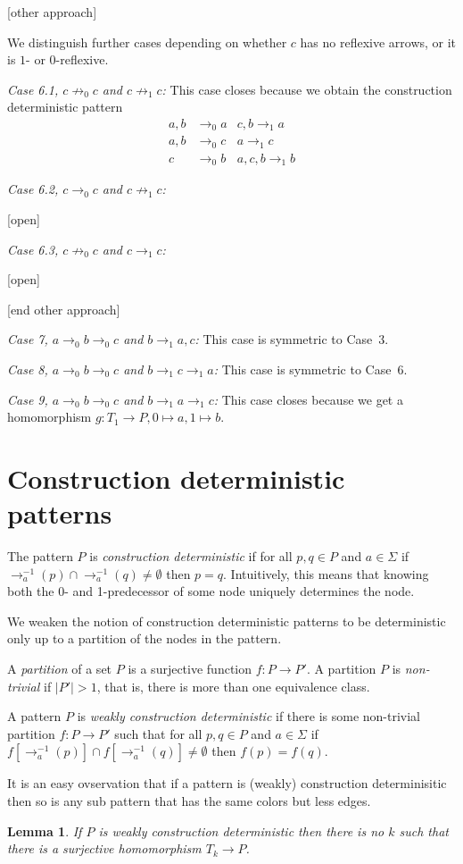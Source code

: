 \documentclass[a4paper]{article}
\newcommand{\prearrow}[1]{{\rightarrow_{#1}^{-1}}}
\newtheorem{lemma}[theorem]{Lemma}
\newcommand{\case}[2]{\vspace{1ex}\noindent\textit{Case #1, #2:}}
\begin{document}
[other approach]

We distinguish
further cases depending on whether $c$ has no reflexive arrows, or it
is $1$- or $0$-reflexive.

\case{6.1}{$c \not \rightarrow_0 c$ and $c \not \rightarrow_1 c$}
This case closes because we obtain the construction deterministic pattern
\begin{align*}
 a,b & \rightarrow_0 a & c,b \rightarrow_1 a \\
 a,b & \rightarrow_0 c & a \rightarrow_1 c \\
 c & \rightarrow_0 b & a,c,b \rightarrow_1 b
\end{align*}

\case{6.2}{$c \rightarrow_0 c$ and $c \not \rightarrow_1 c$}

[open]

\case{6.3}{$c \not \rightarrow_0 c$ and $c \rightarrow_1 c$}

[open]

[end other approach]

\case{7}{$a \rightarrow_0 b \rightarrow_0 c$ and $b \rightarrow_1 a,c$}
This case is symmetric to Case~3.

\case{8}{$a \rightarrow_0 b \rightarrow_0 c$ and $b \rightarrow_1 c
\rightarrow_1 a$}
This case is symmetric to Case~6.

\case{9}{$a \rightarrow_0 b \rightarrow_0 c$ and $b \rightarrow_1 a
\rightarrow_1 c$} This case closes because we get a homomorphism $g :
T_1 \to P, 0 \mapsto a, 1 \mapsto b$.


\section{Construction deterministic patterns}

The pattern $P$ is \emph{construction deterministic} if for all $p,q \in
P$ and $a \in \Sigma$ if $\prearrow{a}(p) \cap \prearrow{a}(q) \neq
\emptyset$ then $p = q$. Intuitively, this means that knowing both the
0- and 1-predecessor of some node uniquely determines the node.

We weaken the notion of construction deterministic patterns to be
deterministic only up to a partition of the nodes in the pattern.

A \emph{partition} of a set $P$ is a surjective function $f : P \to P'$.
A partition $P$ is \emph{non-trivial} if $|P'| > 1$, that is, there is
more than one equivalence class.

A pattern $P$ is \emph{weakly construction deterministic} if there is
some non-trivial partition $f : P \to P'$ such that for all $p,q \in P$
and $a \in \Sigma$ if $f[\prearrow{a}(p)] \cap f[\prearrow{a}(q)] \neq
\emptyset$ then $f(p) = f(q)$.

It is an easy ovservation that if a pattern is (weakly) construction
determinisitic then so is any sub pattern that has the same colors but
less edges.

\begin{lemma} \label{killer lemma}
 If $P$ is weakly construction deterministic then there is no $k$ such
that there is a surjective homomorphism $T_k \to P$.
\end{lemma}
\end{document}
